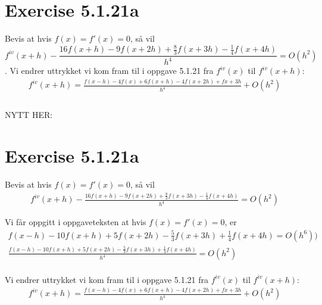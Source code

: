 

\section*{Exercise 5.1.21a}
\label{sec:oppgave21a}

Bevis at hvis $f(x) = f'(x) = 0$, så vil 
\[{f^{iv}}(x + h) - \frac{{16f(x + h) - 9f(x + 2h) + \frac{8}{3}f(x + 3h) - \frac{1}{4}f(x + 4h)}}{{{h^4}}} = O({h^2})\].
Vi endrer uttrykket vi kom fram til i oppgave 5.1.21 fra ${f^{iv}}(x)$ til ${f^{iv}}(x + h)$: 
\begin{align}
{f^{iv}}(x + h) = \frac{{f(x - h) - 4f(x) + 6f(x + h) - 4f(x + 2h) + fx + 3h}}{{{h^4}}} + O({h^2}) \nonumber \\
 \nonumber \\ \nonumber
\end{align}

NYTT HER: 

\section*{Exercise 5.1.21a}
\label{sec:oppgave21a}



Bevis at hvis $f(x) = f'(x) = 0$, så vil 
\begin{align}
{f^{iv}}(x + h) - \frac{{16f(x + h) - 9f(x + 2h) + \frac{8}{3}f(x + 3h) - \frac{1}{4}f(x + 4h)}}{{{h^4}}} = O({h^2})
\end{align}


Vi får oppgitt i oppgaveteksten at hvis $f(x) = f'(x) = 0$, er
\begin{align}
f(x-h)-10f(x+h)+5f(x+2h)-\frac{5}{3}f(x+3h)+\frac{1}{4}f(x+4h)=O(h^6)) \nonumber \\
\frac{f(x-h)-10f(x+h)+5f(x+2h)-\frac{5}{3}f(x+3h)+\frac{1}{4}f(x+4h)}{h^4}=O(h^2) \\
\end{align}


Vi endrer uttrykket vi kom fram til i oppgave 5.1.21 fra ${f^{iv}}(x)$ til ${f^{iv}}(x + h)$: 
\begin{align}
{f^{iv}}(x + h) = \frac{{f(x - h) - 4f(x) + 6f(x + h) - 4f(x + 2h) + fx + 3h}}{{{h^4}}} + O({h^2}) 
\end{align}


